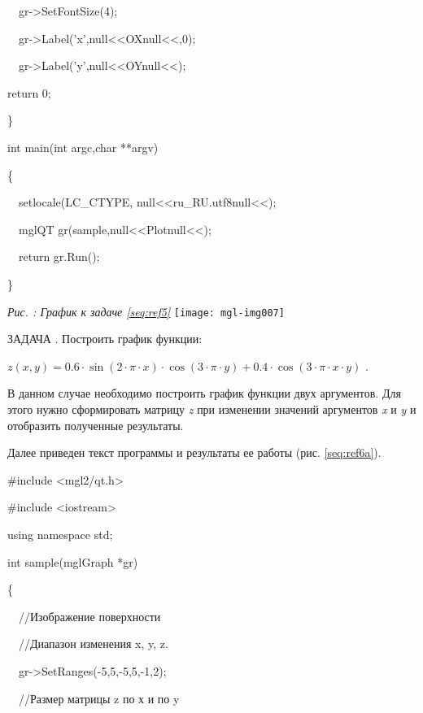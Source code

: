 {\upshape
\ \ gr-{\textgreater}SetFontSize(4);}

{\upshape
\ \ gr-{\textgreater}Label('x',null{<<}OXnull{<<},0);}

{\upshape
\ \ gr-{\textgreater}Label('y',null{<<}OYnull{<<});}

{\upshape
return 0;}

{\upshape
\}}

{\upshape
int main(int argc,char **argv)}

{\upshape
\{}

{\upshape
\ \ setlocale(LC\_CTYPE, null{<<}ru\_RU.utf8null{<<});}

{\upshape
\ \ mglQT gr(sample,null{<<}Plotnull{<<});}

{\upshape
\ \ return gr.Run();}

{\upshape
\}}

\begin{minipage}{11.317cm}
{\itshape
Рис. {\theqwertya\label{seq:ref5a}}: График к задаче \ref{seq:ref5}}
\texttt{[image: mgl-img007]}\end{minipage}

ЗАДАЧА {\theqwerty\label{seq:ref6}}. Построить график функции:

{\centering
 $z(x,y)=0.6\cdot \sin (2\cdot \pi \cdot x)\cdot \cos (3\cdot \pi \cdot y)+0.4\cdot \cos (3\cdot \pi \cdot x\cdot y)$ .
\par}

В данном случае необходимо построить график функции двух аргументов. Для этого нужно сформировать матрицу \textit{z} при
изменении значений аргументов \textit{x} и \textit{y} и отобразить полученные результаты.

Далее приведен текст программы и результаты ее работы (рис. \ref{seq:ref6a}).

{\upshape
\#include {\textless}mgl2/qt.h{\textgreater}}

{\upshape
\#include {\textless}iostream{\textgreater}}

{\upshape
using namespace std;}

{\upshape
int sample(mglGraph *gr)}

{\upshape
\{}

{\upshape
\ \ //Изображение поверхности}

{\upshape
\ \ //Диапазон изменения x, y, z.}

{\upshape
\ \ gr-{\textgreater}SetRanges(-5,5,-5,5,-1,2);}

{\upshape
\ \ //Размер матрицы z по х и по y}

